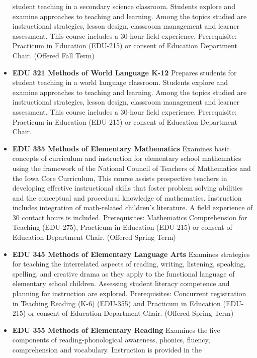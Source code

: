 \documentclass[
  letterpaper,
]{scrbook}
\begin{document}
\begin{itemize}
  student teaching in a secondary science classroom. Students explore
  and examine approaches to teaching and learning. Among the topics
  studied are instructional strategies, lesson design, classroom
  management and learner assessment. This course includes a 30-hour
  field experience. Prerequisite: Practicum in Education (EDU-215) or
  consent of Education Department Chair. (Offered Fall Term)\\
\item
  \textbf{EDU 321 Methods of World Language K-12} Prepares students for
  student teaching in a world language classroom. Students explore and
  examine approaches to teaching and learning. Among the topics studied
  are instructional strategies, lesson design, classroom management and
  learner assessment. This course includes a 30-hour field experience.
  Prerequisite: Practicum in Education (EDU-215) or consent of Education
  Department Chair.\\
\item
  \textbf{EDU 335 Methods of Elementary Mathematics} Examines basic
  concepts of curriculum and instruction for elementary school
  mathematics using the framework of the National Council of Teachers of
  Mathematics and the Iowa Core Curriculum, This course assists
  prospective teachers in developing effective instructional skills that
  foster problem solving abilities and the conceptual and procedural
  knowledge of mathematics. Instruction includes integration of
  math-related children's literature. A field experience of 30 contact
  hours is included. Prerequisites: Mathematics Comprehension for
  Teaching (EDU-275), Practicum in Education (EDU-215) or consent of
  Education Department Chair. (Offered Spring Term)\\
\item
  \textbf{EDU 345 Methods of Elementary Language Arts} Examines
  strategies for teaching the interrelated aspects of reading, writing,
  listening, speaking, spelling, and creative drama as they apply to the
  functional language of elementary school children. Assessing student
  literacy competence and planning for instruction are explored.
  Prerequisites: Concurrent registration in Teaching Reading (K-6)
  (EDU-355) and Practicum in Education (EDU-215) or consent of Education
  Department Chair. (Offered Spring Term)\\
\item
  \textbf{EDU 355 Methods of Elementary Reading} Examines the five
  components of reading-phonological awareness, phonics, fluency,
  comprehension and vocabulary. Instruction is provided in the

\end{itemize}
\end{document}
